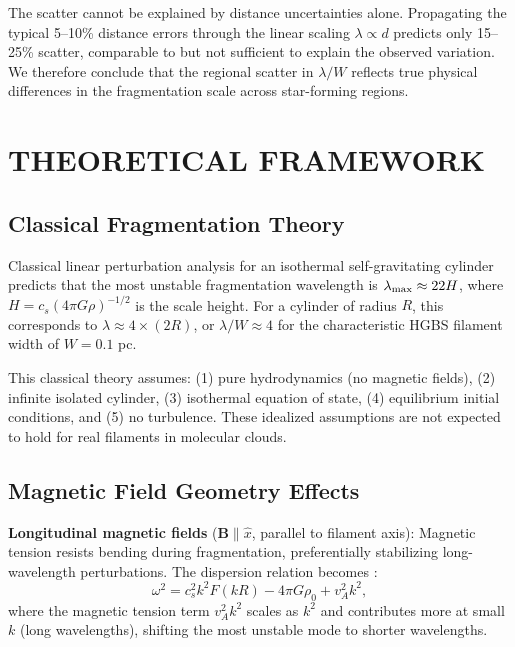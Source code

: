 \documentclass[twoside,twocolumn]{mnras}
\begin{document}
The scatter cannot be explained by distance uncertainties alone. Propagating the typical 5--10\% distance errors through the linear scaling $\lambda \propto d$ predicts only 15--25\% scatter, comparable to but not sufficient to explain the observed variation. We therefore conclude that the regional scatter in $\lambda/W$ reflects true physical differences in the fragmentation scale across star-forming regions.

\section{THEORETICAL FRAMEWORK}

\subsection{Classical Fragmentation Theory}

Classical linear perturbation analysis \citep{Inutsuka1992} for an isothermal self-gravitating cylinder predicts that the most unstable fragmentation wavelength is $\lambda_{\rm max} \approx 22 H$, where $H = c_s (4\pi G \rho)^{-1/2}$ is the scale height. For a cylinder of radius $R$, this corresponds to $\lambda \approx 4 \times (2R)$, or $\lambda/W \approx 4$ for the characteristic HGBS filament width of $W = 0.1$ pc.

This classical theory assumes: (1) pure hydrodynamics (no magnetic fields), (2) infinite isolated cylinder, (3) isothermal equation of state, (4) equilibrium initial conditions, and (5) no turbulence. These idealized assumptions are not expected to hold for real filaments in molecular clouds.

\subsection{Magnetic Field Geometry Effects}

\textbf{Longitudinal magnetic fields} ($\mathbf{B} \parallel \hat{x}$, parallel to filament axis): Magnetic tension resists bending during fragmentation, preferentially stabilizing long-wavelength perturbations. The dispersion relation becomes \citep{Nakamura1993}:
\begin{equation}
\omega^2 = c_s^2 k^2 F(kR) - 4\pi G \rho_0 + v_A^2 k^2,
\end{equation}
where the magnetic tension term $v_A^2 k^2$ scales as $k^2$ and contributes more at small $k$ (long wavelengths), shifting the most unstable mode to shorter wavelengths.
\end{document}
